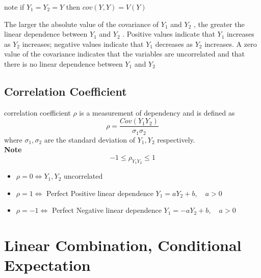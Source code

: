 \documentclass{report}
\begin{document}
note if $Y_1 = Y_2 = Y$ then $cov(Y,Y) = V(Y)$

The larger the absolute value of the covariance of $Y_1$ and $Y_2$ , the greater the
linear dependence between $Y_1$ and $Y_2$ . Positive values indicate that $Y_1$ increases as $Y_2$
increases; negative values indicate that $Y_1$ decreases as $Y_2$ increases. A zero value of
the covariance indicates that the variables are uncorrelated and that there is no linear
dependence between $Y_1$ and $Y_2$ 
\subsection[correlation coeff]{Correlation Coefficient}
\textsf{correlation coefficient} $\rho$ is a measurement of dependency and is defined as $$\rho = \frac{Cov(Y_1Y_2)}{\sigma_1\sigma_2}$$
where $\sigma_1, \sigma_2$ are the standard deviation of $Y_1, Y_2$ respectively.\\
\textbf{Note} $$-1 \leq \rho_{Y_1Y_2} \leq 1$$
\begin{itemize}
	\item $\rho = 0 \iff Y_1,Y_2$ uncorrelated
	\item $\rho = 1 \iff$ Perfect Positive linear dependence $Y_1 = aY_2 + b, \quad a>0$
	\item $\rho = -1 \iff$ Perfect Negative linear dependence $Y_1 = -aY_2 + b, \quad a>0$  
\end{itemize}
\pagebreak
\section{Linear Combination, Conditional Expectation}

\end{document}
